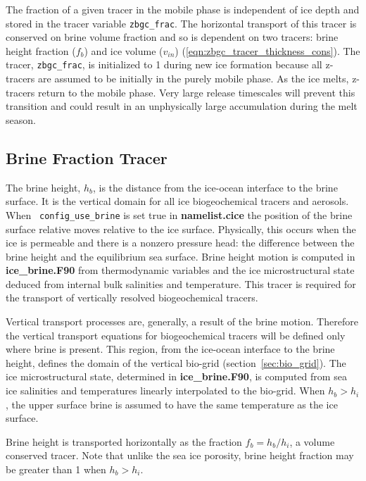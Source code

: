 The fraction of a given tracer in the mobile phase is independent of
ice depth and stored in the
tracer variable  {\tt zbgc\_frac}. The horizontal transport of this
tracer is conserved on brine volume fraction and so is dependent on two
tracers: brine height fraction ($f_b$) and ice volume ($v_{in}$) (\ref{eqn:zbgc_tracer_thickness_cons}).  The tracer, {\tt zbgc\_frac}, is initialized to 1 during new ice formation because
 all z-tracers are assumed to be initially in the purely mobile phase.
As the ice melts, z-tracers return to the mobile phase.
Very large release timescales will prevent this transition and could
result in an unphysically large accumulation during the melt season.

\subsection{Brine Fraction Tracer}
\label{sec:brine}
The brine height, $h_b$, is the distance from the
ice-ocean interface to the brine surface. It is the vertical domain
for all ice biogeochemical tracers and aerosols.   When {\tt
  config\_use\_brine} is set true in {\bf namelist.cice} the position
of the  brine
surface  relative moves relative to the
 ice surface. Physically, this occurs when the ice is permeable and there is
a nonzero pressure head: the difference between the brine
height and the equilibrium sea surface. Brine height motion is
computed in {\bf ice\_brine.F90} from thermodynamic variables and the ice microstructural state
deduced from internal bulk salinities and temperature.  This tracer
is required for the transport of vertically resolved biogeochemical
tracers.

Vertical transport
processes are, generally, a result of the brine motion. Therefore the vertical
transport equations for biogeochemical tracers will be defined only
where brine is present.  This region, from the ice-ocean interface to
the brine height, defines the domain of the vertical bio-grid (section~\ref{sec:bio_grid}). The ice
microstructural state, determined in {\bf ice\_brine.F90}, is computed
from sea ice salinities and temperatures linearly interpolated to the
bio-grid.  When $h_b > h_i$, the upper surface brine is assumed to
have the same temperature as the ice surface.

Brine height is  transported horizontally as the
fraction $f_{b} = h_b/h_i$, a volume conserved
tracer.  Note
that unlike the sea ice porosity, brine height fraction may be greater than 1
when $h_b > h_i$.


